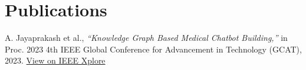 \documentclass[letterpaper,10.5pt]{article}
\begin{document}
\section{Publications}
    \small{A. Jayaprakash et al., \textit{``Knowledge Graph Based Medical Chatbot Building,''} in Proc. 2023 4th IEEE Global Conference for Advancement in Technology (GCAT), 2023. \href{https://ieeexplore.ieee.org/document/10353415}{View on IEEE Xplore}}
\end{document}
